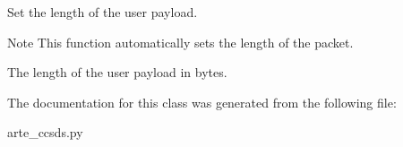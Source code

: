 Set the length of the user payload. 

\begin{DoxyNote}{Note}
This function automatically sets the length of the packet.
\end{DoxyNote}
\begin{DoxyVerb}        The length of the user payload in bytes. \end{DoxyVerb}
 

The documentation for this class was generated from the following file\+:\begin{DoxyCompactItemize}
\item 
arte\+\_\+ccsds.\+py\end{DoxyCompactItemize}
